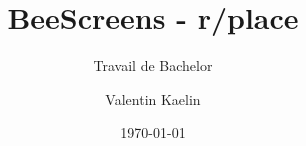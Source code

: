 \author{Valentin Kaelin}


\title{BeeScreens - r/place}

\subtitle{Travail de Bachelor}


\date{\today}


